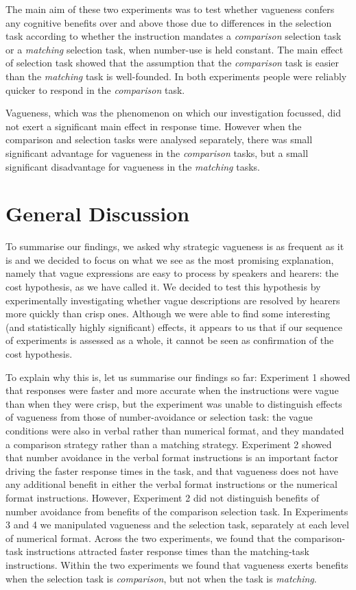 \documentclass[%
man,		%
floatsintext,%
apacite%
]{apa6} %
\begin{document}
The main aim of these two experiments was to test whether vagueness confers any cognitive benefits over and above those due to differences in the selection task according to whether the instruction mandates a \emph{comparison} selection task or a \emph{matching} selection task, when number-use is held constant. The main effect of selection task showed that the assumption that the \emph{comparison} task is easier than the \emph{matching} task is well-founded. In both experiments people were reliably quicker to respond in the \emph{comparison} task. 

Vagueness, which was the phenomenon on which our investigation focussed, did not exert a significant main effect in response time. However when the comparison and selection tasks were analysed separately, there was small significant advantage for vagueness in the \emph{comparison} tasks, but a small significant disadvantage for vagueness in the \emph{matching} tasks. 

\section{General Discussion}\label{discussion}

To summarise our findings, we asked why strategic vagueness is as frequent as it is and we decided to focus on what we see as the most promising explanation, namely that vague expressions are easy to process by speakers and hearers: the cost hypothesis, as we have called it. We decided to test this hypothesis by experimentally investigating whether vague descriptions are resolved by hearers more quickly than crisp ones. Although we were able to find some interesting (and statistically highly significant) effects, it appears to us that if our sequence of experiments is assessed as a whole, it cannot be seen as confirmation of the cost hypothesis.

To explain why this is, let us summarise our findings so far: Experiment 1 showed that responses were faster and more accurate when the instructions were vague than when they were crisp, but the experiment was unable to distinguish effects of vagueness from those of number-avoidance or selection task: the vague conditions were also in verbal rather than numerical format, and they mandated a comparison strategy rather than a matching strategy. Experiment 2 showed that number avoidance in the verbal format instructions is an important factor driving the faster response times in the task, and that vagueness does not have any additional benefit in either the verbal format instructions or the numerical format instructions. However, Experiment 2 did not distinguish benefits of number avoidance from benefits of the comparison selection task. In Experiments 3 and 4 we manipulated vagueness and the selection task, separately at each level of numerical format. Across the two experiments, we found that the comparison-task instructions attracted faster response times than the matching-task instructions. Within the two experiments we found that vagueness exerts benefits when the selection task is \emph{comparison}, but not when the task is \emph{matching}.
\end{document}
